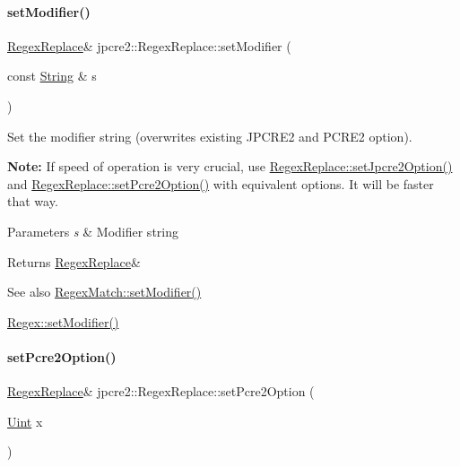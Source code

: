 \paragraph{\texorpdfstring{set\+Modifier()}{setModifier()}}
{\footnotesize\ttfamily \hyperlink{classjpcre2_1_1RegexReplace}{Regex\+Replace}\& jpcre2\+::\+Regex\+Replace\+::set\+Modifier (\begin{DoxyParamCaption}\item[{const \hyperlink{namespacejpcre2_a91f03070152fb228bc116c5a737f1d16}{String} \&}]{s }\end{DoxyParamCaption})\hspace{0.3cm}{\ttfamily [inline]}}



Set the modifier string (overwrites existing J\+P\+C\+R\+E2 and P\+C\+R\+E2 option). 

{\bfseries Note\+:} If speed of operation is very crucial, use \hyperlink{classjpcre2_1_1RegexReplace_a745ab0b979035214a83ed0a04686ef6a_a745ab0b979035214a83ed0a04686ef6a}{Regex\+Replace\+::set\+Jpcre2\+Option()} and \hyperlink{classjpcre2_1_1RegexReplace_aec36272d351fdc3a8cb02a4a3efea5a2_aec36272d351fdc3a8cb02a4a3efea5a2}{Regex\+Replace\+::set\+Pcre2\+Option()} with equivalent options. It will be faster that way. 
\begin{DoxyParams}{Parameters}
{\em s} & Modifier string \\
\hline
\end{DoxyParams}
\begin{DoxyReturn}{Returns}
\hyperlink{classjpcre2_1_1RegexReplace}{Regex\+Replace}\& 
\end{DoxyReturn}
\begin{DoxySeeAlso}{See also}
\hyperlink{classjpcre2_1_1RegexMatch_a9df7e92f96b61553f62720cb8f5f23e5_a9df7e92f96b61553f62720cb8f5f23e5}{Regex\+Match\+::set\+Modifier()} 

\hyperlink{classjpcre2_1_1Regex_aed9865b58c60945e19f36fa310f5a595_aed9865b58c60945e19f36fa310f5a595}{Regex\+::set\+Modifier()} 
\end{DoxySeeAlso}
\hypertarget{classjpcre2_1_1RegexReplace_aec36272d351fdc3a8cb02a4a3efea5a2_aec36272d351fdc3a8cb02a4a3efea5a2}{}\label{classjpcre2_1_1RegexReplace_aec36272d351fdc3a8cb02a4a3efea5a2_aec36272d351fdc3a8cb02a4a3efea5a2} 
\paragraph{\texorpdfstring{set\+Pcre2\+Option()}{setPcre2Option()}}
{\footnotesize\ttfamily \hyperlink{classjpcre2_1_1RegexReplace}{Regex\+Replace}\& jpcre2\+::\+Regex\+Replace\+::set\+Pcre2\+Option (\begin{DoxyParamCaption}\item[{\hyperlink{namespacejpcre2_a078242d38221a13fb3543b9edd78c099}{Uint}}]{x }\end{DoxyParamCaption})\hspace{0.3cm}{\ttfamily [inline]}}



